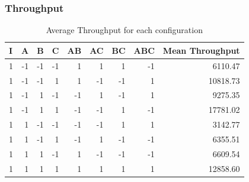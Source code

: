\documentclass[11pt,a4paper]{article}
\begin{document}
\subsubsection{Throughput}
\begin{table}[H]
	\caption{Average Throughput for each configuration}
	\centering
	\begin{tabular}{|r|r|r|r|r|r|r|r|r|}
		\hline
		\multicolumn{1}{|l|}{I} & \multicolumn{1}{l|}{A} & \multicolumn{1}{l|}{B} & \multicolumn{1}{l|}{C} & \multicolumn{1}{l|}{AB} & \multicolumn{1}{l|}{AC} & \multicolumn{1}{l|}{BC} & \multicolumn{1}{l|}{ABC} & \multicolumn{1}{l|}{Mean Throughput} \\ \hline
		1 & -1 & -1 & -1 & 1 & 1 & 1 & -1 & 6110.47 \\ \hline
		1 & -1 & -1 & 1 & 1 & -1 & -1 & 1 & 10818.73 \\ \hline
		1 & -1 & 1 & -1 & -1 & 1 & -1 & 1 & 9275.35 \\ \hline
		1 & -1 & 1 & 1 & -1 & -1 & 1 & -1 & 17781.02 \\ \hline
		1 & 1 & -1 & -1 & -1 & -1 & 1 & 1 & 3142.77 \\ \hline
		1 & 1 & -1 & 1 & -1 & 1 & -1 & -1 & 6355.51 \\ \hline
		1 & 1 & 1 & -1 & 1 & -1 & -1 & -1 & 6609.54 \\ \hline
		1 & 1 & 1 & 1 & 1 & 1 & 1 & 1 & 12858.60 \\ \hline
	\end{tabular}
	\label{}
\end{table}
\end{document}
